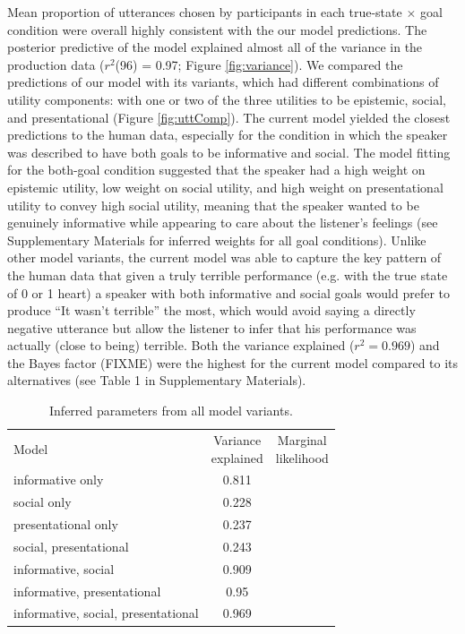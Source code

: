 \documentclass[12pt]{article}
\begin{document}
Mean proportion of utterances chosen by participants in each true-state \(\times\) goal condition were 
overall highly consistent with the our model predictions. 
The posterior predictive of the model explained almost all of the variance in the production data 
(\(r^2\)(96) = 0.97; Figure \ref{fig:variance}). 
We compared the predictions of our model with its variants, which had different combinations of utility components: 
with one or two of the three utilities to be epistemic, social, and presentational (Figure \ref{fig:uttComp}). 
The current model yielded the closest predictions to the human data, especially for the condition in which the speaker was described to have both goals to be informative and social.
The model fitting for the both-goal condition suggested that 
the speaker had a high weight on epistemic utility, low weight on social utility, 
and high weight on presentational utility to convey high social utility, 
meaning that the speaker wanted to be genuinely informative while appearing to care about the listener's feelings
(see Supplementary Materials for inferred weights for all goal conditions). 
Unlike other model variants, the current model was able to capture the key pattern of the human data 
that given a truly terrible performance (e.g. with the true state of 0 or 1 heart) a speaker with both informative and social goals would prefer to produce ``It wasn't terrible'' the most, 
which would avoid saying a directly negative utterance but allow the listener to infer that his performance was actually (close to being) terrible. 
Both the variance explained ($r^2 = 0.969$) and the Bayes factor (FIXME) were the highest 
for the current model compared to its alternatives (see Table 1 in Supplementary Materials).


\begin{table}[]
\centering
\begin{tabular}{lcc}
Model                                    & \thead{Variance \\explained} & \thead{Marginal \\likelihood }\\
informative only                    & 0.811              &            \\
social only                         & 0.228              &            \\
presentational only                 & 0.237              &            \\
social, presentational              & 0.243              &            \\
informative, social                 & 0.909              &            \\
informative, presentational         & 0.95               &            \\
informative, social, presentational & 0.969              &           
\end{tabular}
\caption{Inferred parameters from all model variants.}
\label{table:params2}
\end{table}
\end{document}
